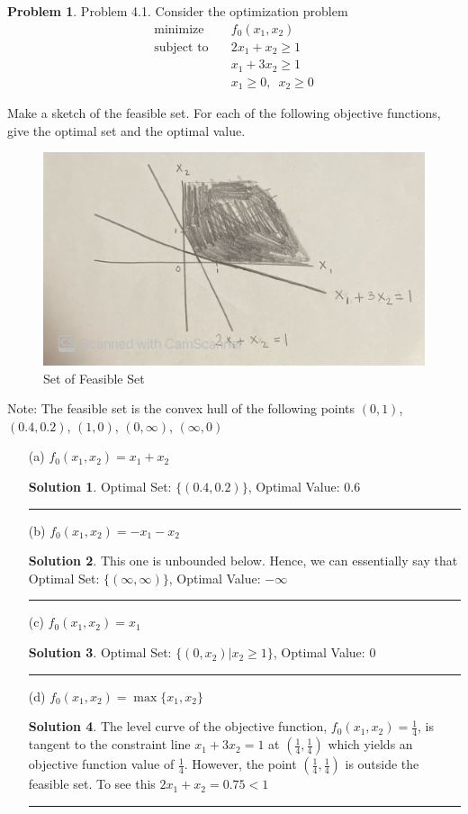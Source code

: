 \documentclass{article}
\theoremstyle{definition}
\newtheorem{problem}{Problem}
\def\fline{\rule{0.75\linewidth}{0.5pt}}
\newcommand{\finishline}{\begin{center}\fline\end{center}}
\newtheorem*{solution*}{Solution}
\newenvironment{solution}{\begin{solution*}}{{\finishline} \end{solution*}}
\begin{document}
\begin{problem}
    Problem 4.1. Consider the optimization problem 
    \begin{align*}
\text{minimize} \quad & f_0(x_1, x_2) \\
\text{subject to} \quad & 2x_1 + x_2 \geq 1\\
\quad & x_1 + 3x_2 \geq 1\\
& x_1 \geq 0, \enspace x_2 \geq 0
\end{align*}

Make a sketch of the feasible set. For each of the following objective functions, give the optimal set and the optimal value.

\begin{figure}[h!]
        \centering
        \includegraphics[width=0.6 \textwidth]{HW8-2n_1.jpg}
        \caption{Set of Feasible Set}
    \end{figure}

Note: The feasible set is the convex hull of the following points $(0, 1)$, $(0.4, 0.2)$, $(1, 0)$, $(0, \infty)$, $(\infty, 0)$

\begin{itemize}
    \item[(a)] $f_0(x_1, x_2) = x_1 + x_2$
    \begin{solution}
        Optimal Set: $\{(0.4, 0.2)\}$, Optimal Value: $0.6$
    \end{solution}
    \item[(b)] $f_0(x_1, x_2) = - x_1 - x_2$
    \begin{solution}
        This one is unbounded below. Hence, we can essentially say that Optimal Set: $\{(\infty, \infty)\}$, Optimal Value: $-\infty$
    \end{solution}
    \item[(c)] $f_0(x_1, x_2) = x_1$  
    \begin{solution}
        Optimal Set: $\{(0, x_2) | x_2 \geq 1\}$, Optimal Value: $0$
    \end{solution}
    \item[(d)] $f_0(x_1, x_2) = \max\{x_1, x_2\}$
    \begin{solution}
    The level curve of the objective function, $f_0(x_1, x_2) = \frac{1}{4}$, is tangent to the constraint line $x_1 + 3x_2 = 1$ at $(\frac{1}{4}, \frac{1}{4})$ which yields an objective function value of $\frac{1}{4}$. However, the point $(\frac{1}{4}, \frac{1}{4})$ is outside the feasible set. To see this $2x_1 + x_2 = 0.75 < 1$ \newline 
    

\end{solution}
\end{itemize}
\end{problem}
\end{document}
